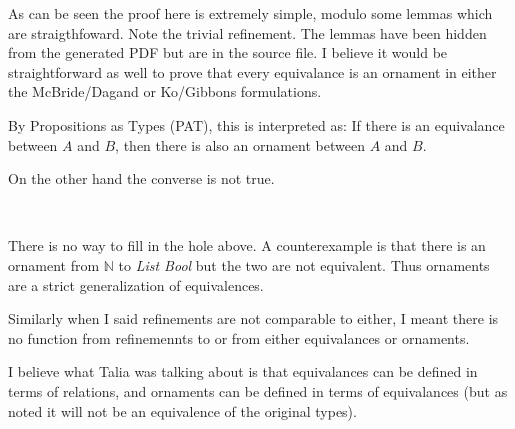\documentclass{article}
\begin{document}
As can be seen the proof here is extremely simple, modulo some lemmas
which are straigthfoward.  Note the trivial refinement.  The lemmas
have been hidden from the generated PDF but are in the source file. I
believe it would be straightforward as well to prove that every
equivalance is an ornament in either the McBride/Dagand or Ko/Gibbons
formulations.

By Propositions as Types (PAT), this is interpreted as: If there is
an equivalance between $A$ and $B$, then there is also an ornament
between $A$ and $B$.

On the other hand the converse is not true.
\begin{code}%
\>[0]\AgdaSpace{}%
\AgdaSymbol{:}\AgdaSpace{}%
\AgdaSymbol{\{}\AgdaSpace{}%
\AgdaSpace{}%
\AgdaSpace{}%
\AgdaSymbol{:}\AgdaSpace{}%
\AgdaSymbol{\}\{}\AgdaSpace{}%
\AgdaSymbol{:}\AgdaSpace{}%
\AgdaSpace{}%
\AgdaSymbol{\}}\AgdaSpace{}%
\AgdaSpace{}%
\AgdaSymbol{\{}\AgdaSpace{}%
\AgdaSymbol{:}\AgdaSpace{}%
\AgdaSpace{}%
\AgdaSymbol{\}}\AgdaSpace{}%
\AgdaSpace{}%
\AgdaSpace{}%
\AgdaSymbol{\{}\AgdaSpace{}%
\AgdaSymbol{=}\AgdaSpace{}%
\AgdaSymbol{\}}\AgdaSpace{}%
\AgdaSpace{}%
\AgdaSpace{}%
\AgdaSpace{}%
\AgdaSpace{}%
\AgdaSpace{}%
\<%
\\
\>[0]\AgdaSpace{}%
\AgdaSpace{}%
\AgdaSymbol{=}\AgdaSpace{}%
\AgdaSymbol{\{!!\}}\<%
\end{code}

There is no way to fill in the hole above.  A counterexample is that
there is an ornament from $ℕ$ to \textit{List Bool} but the two are
not equivalent. Thus ornaments are a strict generalization of
equivalences.

Similarly when I said refinements are not comparable to either, I
meant there is no function from refinemennts to or from either
equivalances or ornaments.

I believe what Talia was talking about is that equivalances can be
defined in terms of relations, and ornaments can be defined in terms
of equivalances (but as noted it will not be an equivalence of the
original types).
\end{document}

